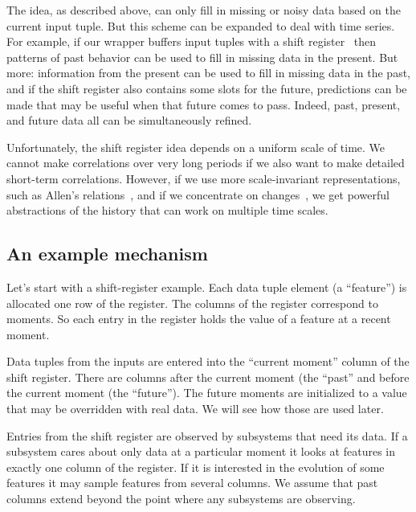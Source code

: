 \documentclass[letterpaper]{article}
\begin{document}
The idea, as described above, can only fill in missing or noisy data
based on the current input tuple.  But this scheme can be expanded to
deal with time series.  For example, if our wrapper buffers input
tuples with a shift register~\cite{DBLP:conf/aaai/YipS97}
then patterns of past behavior can be used to fill in missing data in
the present.  But more: information from the present can be used to
fill in missing data in the past, and if the shift register also
contains some slots for the future, predictions can be made that may
be useful when that future comes to pass.  Indeed, past, present, and
future data all can be simultaneously refined.

Unfortunately, the shift register idea depends on a uniform scale of
time.  We cannot make correlations over very long periods if we also
want to make detailed short-term correlations.  However, if we use
more scale-invariant representations, such as Allen's
relations~\cite{allen83}, and if we concentrate on
changes~\cite{borchardt}, we get powerful abstractions of the history
that can work on multiple time scales.


\subsection{An example mechanism}

Let's start with a shift-register example.  Each data tuple element
(a ``feature'') is allocated one row of the register.  The columns of
the register correspond to moments.  So each entry in the register
holds the value of a feature at a recent moment.

Data tuples from the inputs are entered into the ``current moment''
column of the shift register.  There are columns after the current
moment (the ``past'' and before the current moment (the ``future'').  The
future moments are initialized to a value that may be overridden with
real data.  We will see how those are used later.

Entries from the shift register are observed by subsystems that need
its data.  If a subsystem cares about only data at a particular moment
it looks at features in exactly one column of the register.  If it is
interested in the evolution of some features it may sample features
from several columns.  We assume that past columns extend beyond the
point where any subsystems are observing.
\end{document}
